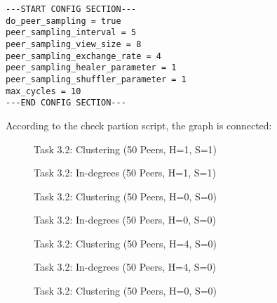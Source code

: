 \documentclass[a4paper]{article}
\begin{document}
\begin{lstlisting}
---START CONFIG SECTION---
do_peer_sampling = true
peer_sampling_interval = 5
peer_sampling_view_size = 8
peer_sampling_exchange_rate = 4
peer_sampling_healer_parameter = 1
peer_sampling_shuffler_parameter = 1
max_cycles = 10
---END CONFIG SECTION---
\end{lstlisting}

According to the check partion script, the graph is connected:



\begin{figure}
    
    \caption{Task 3.2: Clustering (50 Peers, H=1, S=1)}
    \label{fig:3-2_h1s1_clustering}
\end{figure}

\begin{figure}
    
    \caption{Task 3.2: In-degrees (50 Peers, H=1, S=1)}
    \label{fig:3-2_h1s1_indegrees}
\end{figure}

\begin{figure}
    
    \caption{Task 3.2: Clustering (50 Peers, H=0, S=0)}
    \label{fig:3-2_h0s0_clustering}
\end{figure}

\begin{figure}
    
    \caption{Task 3.2: In-degrees (50 Peers, H=0, S=0)}
    \label{fig:3-2_h0s0_indegrees}
\end{figure}

\begin{figure}
    
    \caption{Task 3.2: Clustering (50 Peers, H=4, S=0)}
    \label{fig:3-2_h4s0_clustering}
\end{figure}

\begin{figure}
    
    \caption{Task 3.2: In-degrees (50 Peers, H=4, S=0)}
    \label{fig:3-2_h4s0_indegrees}
\end{figure}

\begin{figure}
    
    \caption{Task 3.2: Clustering (50 Peers, H=0, S=0)}
    \label{fig:3-2_h0s4_clustering}
\end{figure}
\end{document}
